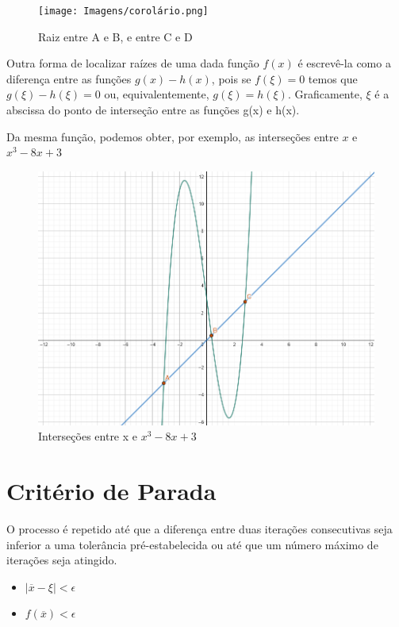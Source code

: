 \begin{figure}[h]
    \centering
    \texttt{[image: Imagens/corolário.png]}
    \caption{Raiz entre A e B, e entre C e D}
    \label{fig:coro}
\end{figure}

\newpage

Outra forma de localizar raízes de uma dada função $f(x)$ é escrevê-la como a diferença entre as funções $g(x)-h(x)$, pois se $f(\xi) = 0$ temos que $g(\xi) - h(\xi) = 0$ ou, equivalentemente, $g(\xi) = h(\xi)$. Graficamente, $\xi$ é a abscissa do ponto de interseção entre as funções g(x) e h(x).

Da mesma função, podemos obter, por exemplo, as interseções entre $x$ e $x^3 - 8x + 3$
\begin{figure}[h]
    \centering
    \includegraphics[height = 0.5\textwidth]{Imagens/interseções.png}
    \caption{Interseções entre x e $x^3 - 8x + 3$}
    \label{fig:inters}
\end{figure}

\section{Critério de Parada}
O processo é repetido até que a diferença entre duas iterações consecutivas seja inferior a uma tolerância pré-estabelecida %
ou até que um número máximo de iterações seja atingido.

\begin{itemize} %
    \item $|\overline{x} - \xi| < \epsilon$
    \item $f(\overline{x}) < \epsilon$
\end{itemize}

